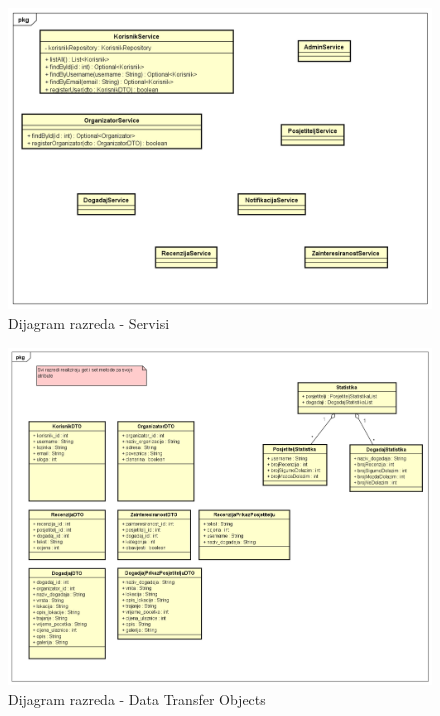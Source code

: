 			\begin{figure}[H]
				\includegraphics[scale=0.55]{dijagramiKlasa/Dijagram razreda - Servisi.png} %
				\centering
				\caption{Dijagram razreda - Servisi}
				\label{fig:promjene}
			\end{figure}
			
			\begin{figure}[H]
				\includegraphics[scale=0.43]{dijagramiKlasa/Dijagram razreda - DTO.png} %
				\centering
				\caption{Dijagram razreda - Data Transfer Objects}
				\label{fig:promjene}
			\end{figure}
			

